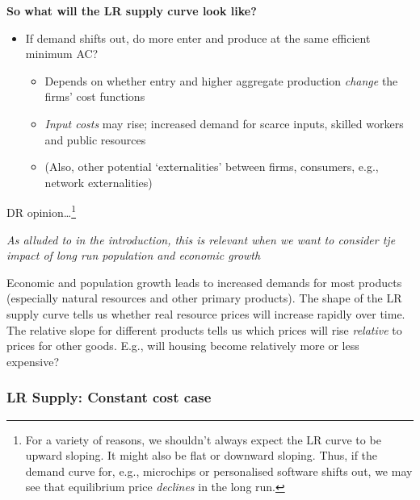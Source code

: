 \documentclass[]{article}
\providecommand{\tightlist}{%
  \setlength{\itemsep}{0pt}\setlength{\parskip}{0pt}}
\begin{document}
\bigskip

\textbf{So what will the LR supply curve look like?}

\begin{itemize}
\tightlist
\item
  If demand shifts out, do more enter and produce at the same efficient
  minimum AC?

  \begin{itemize}
  \tightlist
  \item
    Depends on whether entry and higher aggregate production
    \emph{change} the firms' cost functions
  \item
    \emph{Input costs} may rise; increased demand for scarce inputs,
    skilled workers and public resources
  \item
    (Also, other potential `externalities' between firms, consumers,
    e.g., network externalities)
  \end{itemize}
\end{itemize}

DR opinion\ldots{}\footnote{For a variety of reasons, we shouldn't
  always expect the LR curve to be upward sloping. It might also be flat
  or downward sloping. Thus, if the demand curve for, e.g., microchips
  or personalised software shifts out, we may see that equilibrium price
  \emph{declines} in the long run.}

\bigskip

\emph{As alluded to in the introduction, this is relevant when we want
to consider tje impact of long run population and economic growth}

Economic and population growth leads to increased demands for most
products (especially natural resources and other primary products). The
shape of the LR supply curve tells us whether real resource prices will
increase rapidly over time.\\

The relative slope for different products tells us which prices will
rise \emph{relative} to prices for other goods. E.g., will housing
become relatively more or less expensive?

\hypertarget{lr-supply-constant-cost-case}{%
\subsubsection{LR Supply: Constant cost
case}\label{lr-supply-constant-cost-case}}
\end{document}
